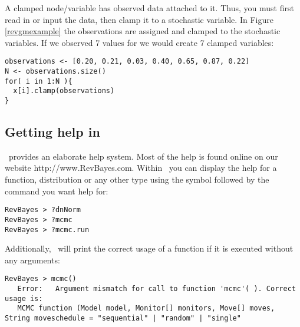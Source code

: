 A clamped node/variable has observed data attached to it. 
Thus, you must first read in or input the data, then clamp it to a stochastic variable. 
In Figure \ref{revgmexample} the observations are assigned and clamped to the stochastic variables.
If we observed 7 values for  we would create 7 clamped variables:
{\tt \begin{snugshade*}
\begin{lstlisting}
observations <- [0.20, 0.21, 0.03, 0.40, 0.65, 0.87, 0.22]
N <- observations.size()
for( i in 1:N ){
  x[i].clamp(observations)
}
\end{lstlisting}
\end{snugshade*}}



\subsection*{Getting help in \RevBayes}

\RevBayes~provides an elaborate help system. 
Most of the help is found online on our website http://www.RevBayes.com.
Within \RevBayes~you can display the help for a function, distribution or any other type using the  symbol followed by the command you want help for:
{\tt \begin{snugshade*}
\begin{lstlisting}
RevBayes > ?dnNorm
RevBayes > ?mcmc
RevBayes > ?mcmc.run
\end{lstlisting}
\end{snugshade*}}

Additionally, \RevBayes~will print the correct usage of a function if it is executed without any arguments:
{\tt \small \begin{snugshade*}
\begin{lstlisting}
RevBayes > mcmc()
   Error:   Argument mismatch for call to function 'mcmc'( ). Correct usage is:
   MCMC function (Model model, Monitor[] monitors, Move[] moves, String moveschedule = "sequential" | "random" | "single"
\end{lstlisting}
\end{snugshade*}}

%



